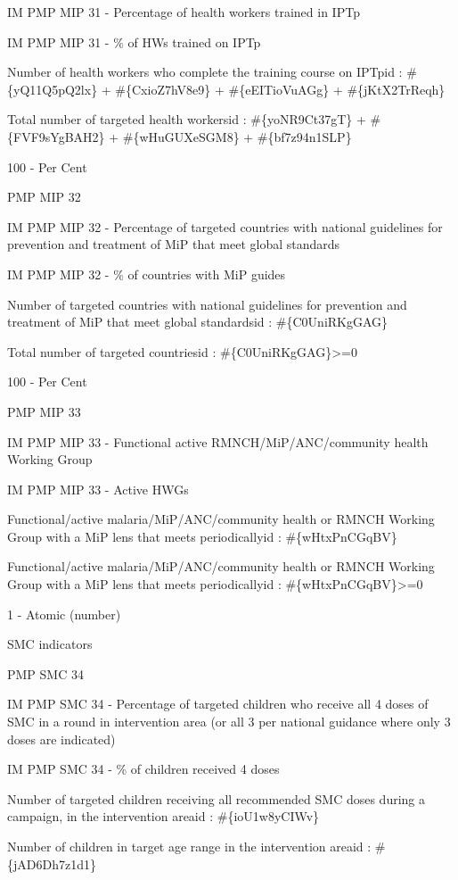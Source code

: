 \documentclass[]{book}
\begin{document}
IM PMP MIP 31 - Percentage of health workers trained in IPTp

IM PMP MIP 31 - \% of HWs trained on IPTp

Number of health workers who complete the training course on IPTpid : \#\{yQ11Q5pQ2lx\} + \#\{CxioZ7hV8e9\} + \#\{eEITioVuAGg\} + \#\{jKtX2TrReqh\}

Total number of targeted health workersid : \#\{yoNR9Ct37gT\} + \#\{FVF9sYgBAH2\} + \#\{wHuGUXeSGM8\} + \#\{bf7z94n1SLP\}

100 - Per Cent

PMP MIP 32

IM PMP MIP 32 - Percentage of targeted countries with national guidelines for prevention and treatment of MiP that meet global standards

IM PMP MIP 32 - \% of countries with MiP guides

Number of targeted countries with national guidelines for prevention and treatment of MiP that meet global standardsid : \#\{C0UniRKgGAG\}

Total number of targeted countriesid : \#\{C0UniRKgGAG\}\textgreater{}=0

100 - Per Cent

PMP MIP 33

IM PMP MIP 33 - Functional active RMNCH/MiP/ANC/community health Working Group

IM PMP MIP 33 - Active HWGs

Functional/active malaria/MiP/ANC/community health or RMNCH Working Group with a MiP lens that meets periodicallyid : \#\{wHtxPnCGqBV\}

Functional/active malaria/MiP/ANC/community health or RMNCH Working Group with a MiP lens that meets periodicallyid : \#\{wHtxPnCGqBV\}\textgreater{}=0

1 - Atomic (number)

SMC indicators

PMP SMC 34

IM PMP SMC 34 - Percentage of targeted children who receive all 4 doses of SMC in a round in intervention area (or all 3 per national guidance where only 3 doses are indicated)

IM PMP SMC 34 - \% of children received 4 doses

Number of targeted children receiving all recommended SMC doses during a campaign, in the intervention areaid : \#\{ioU1w8yCIWv\}

Number of children in target age range in the intervention areaid : \#\{jAD6Dh7z1d1\}
\end{document}
